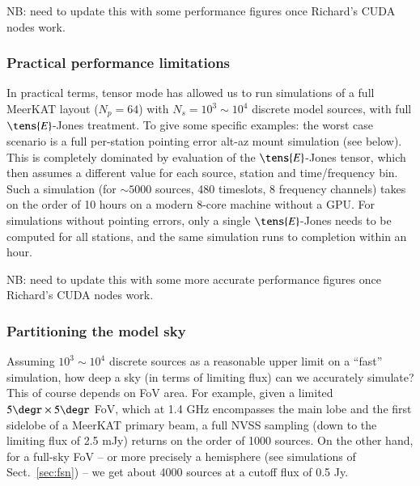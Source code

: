 \documentclass{aa}
\begin{document}
NB: need to update this with some performance figures once Richard's CUDA nodes work.

\subsubsection{Practical performance limitations}

In practical terms, tensor mode has allowed us to run simulations of a full MeerKAT layout ($N_p=64$) 
with $N_s=10^3\sim10^4$ discrete model sources, with full $\tens{E}$-Jones treatment. To give some specific examples: the worst case scenario is a full per-station pointing error alt-az mount simulation (see below). This is completely dominated by evaluation of the $\tens{E}$-Jones tensor, which then assumes a different value for each source, station and time/frequency bin. Such a simulation (for $\sim5000$ sources, 480 timeslots, 8 frequency channels) takes on the order of 10 hours on a modern 8-core machine without a GPU. For simulations without pointing errors, only a single $\tens{E}$-Jones needs to be computed for all stations, and the same simulation runs to completion within an hour.

NB: need to update this with some more accurate performance figures once Richard's CUDA nodes work.

\subsubsection{Partitioning the model sky}

Assuming $10^3\sim10^4$ discrete sources as a reasonable upper limit on a ``fast'' simulation, how deep a sky (in terms of limiting flux) can we accurately simulate? This of course depends on FoV area. For example, given a limited $5\degr\times5\degr$ FoV, which at 1.4 GHz encompasses the main lobe and the first sidelobe of a MeerKAT primary beam, a full NVSS sampling (down to the limiting flux of 2.5 mJy) returns on the order of 1000 sources. On the other hand, for a full-sky FoV -- or more precisely a hemisphere (see simulations of Sect.~\ref{sec:fsn}) -- we get about 4000 sources at a cutoff flux of 0.5 Jy. 
\end{document}
